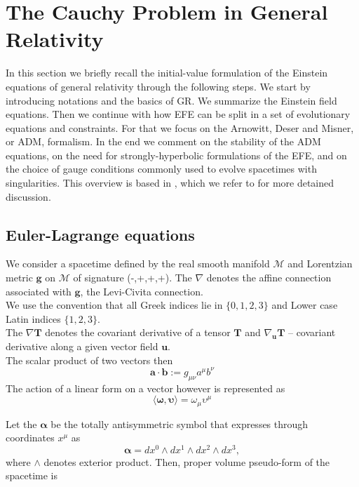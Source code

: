 \documentclass[11pt,a4paper,headinclude=true,DIV=14,BCOR=8mm,chapterprefix,listof=totoc,twoside,openright,abstracton]{scrbook}
\begin{document}
\section{The Cauchy Problem in General Relativity}

In this section we briefly recall the initial-value formulation of the Einstein equations of general relativity through the following steps. We start by introducing notations and the basics of GR. We summarize the Einstein field equations. Then we continue with how EFE can be split in a set of evolutionary equations and constraints. For that we focus on the Arnowitt, Deser and Misner, or ADM, formalism. In the end we comment on the stability of the ADM equations, on the need for strongly-hyperbolic formulations of the EFE, and on the choice of gauge conditions commonly used to
evolve spacetimes with singularities. This overview is based in \cite{Arnowitt:1962hi,Landau:1982dva,Wald:1984,Misner:1973,Baumgarte:2002jm}, which we refer to for more detained discussion.

\subsection{Euler-Lagrange equations}

We consider a spacetime defined by the real smooth manifold $\mathcal{M}$ and Lorentzian metric $\boldsymbol{g}$ on $\mathcal{M}$ of signature (-,+,+,+). The $\nabla$ denotes the affine connection associated with $\boldsymbol{g}$, the Levi-Civita connection. \\
We use the convention that all Greek indices lie in $\{0, 1, 2, 3\}$ and Lower case Latin indices $\{1, 2, 3\}$. \\
The $\nabla\boldsymbol{T}$ denotes the covariant derivative of a tensor $\boldsymbol{T}$ and $\nabla_{\boldsymbol{u}}\boldsymbol{T}$ -- covariant derivative along a given vector field $\boldsymbol{u}$.\\
The scalar product of two vectors then 
\begin{equation}
    \boldsymbol{a}\cdot\boldsymbol{b}:=g_{\mu\nu}a^{\mu}b^{\nu}
\end{equation}
The action of a linear form on a vector however is represented as 
\begin{equation}
    \langle\boldsymbol{\omega},\boldsymbol{\upsilon}\rangle=\omega_{\mu}\upsilon^{\mu}
\end{equation}

Let the $\boldsymbol{\alpha}$ be the totally antisymmetric symbol that expresses through coordinates $x^{\mu}$ as
\begin{equation}
    \boldsymbol{\alpha} = dx^0 \wedge dx^1 \wedge dx^2 \wedge dx^3,
\end{equation}
where $\wedge$ denotes exterior product. Then, proper volume pseudo-form of the spacetime is
\end{document}
